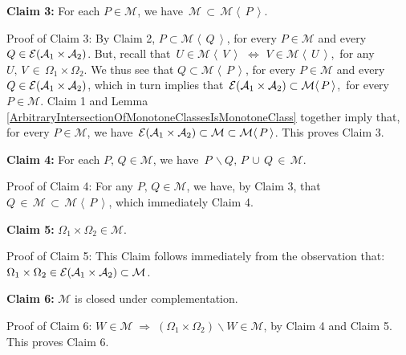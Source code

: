 \vskip 0.5cm
\begin{center}
\begin{minipage}{6.5in}
\textbf{Claim 3:}\quad
For each $P \in \mathcal{M}$, we have \,$\mathcal{M} \,\subset\, \mathcal{M}\!\left\langle\,P\,\right\rangle$.
\end{minipage}
\end{center}
Proof of Claim 3:\quad
By Claim 2, $P \subset \mathcal{M}\!\left\langle\,Q\,\right\rangle$, for every $P\in\mathcal{M}$ and
every $Q \in \mathcal{E}\!\left(\mathcal{A}_{1}\times\mathcal{A}_{2}\right)$.
But, recall that
\,$U\in\mathcal{M}\!\left\langle\,V\,\right\rangle$ $\Longleftrightarrow$ $V\in\mathcal{M}\!\left\langle\,U\,\right\rangle$,\,
for any $U,\,V\,\in\,\Omega_{1}\times\Omega_{2}$.
We thus see that
$Q \subset \mathcal{M}\!\left\langle\,P\,\right\rangle$, for every $P\in\mathcal{M}$ and
every $Q \in \mathcal{E}\!\left(\mathcal{A}_{1}\times\mathcal{A}_{2}\right)$,
which in turn implies that
\,$\mathcal{E}\!\left(\mathcal{A}_{1}\times\mathcal{A}_{2}\right) \subset \mathcal{M}\!\left\langle\,P\,\right\rangle$,\,
for every $P \in \mathcal{M}$.
Claim 1 and Lemma \ref{ArbitraryIntersectionOfMonotoneClassesIsMonotoneClass} together imply that,
for every $P \in \mathcal{M}$, we have
\,$\mathcal{E}\!\left(\mathcal{A}_{1}\times\mathcal{A}_{2}\right) \subset \mathcal{M} \subset \mathcal{M}\!\left\langle\,P\,\right\rangle$.
This proves Claim 3.

\vskip 0.5cm
\begin{center}
\begin{minipage}{6.5in}
\textbf{Claim 4:}\quad
For each $P,\, Q \in \mathcal{M}$, we have \,$P\,\backslash Q,\, P\,\cup\,Q \,\in\, \mathcal{M}$.
\end{minipage}
\end{center}
Proof of Claim 4:\quad
For any $P,\, Q \in \mathcal{M}$, we have, by Claim 3, that
$Q \,\in\, \mathcal{M} \,\subset\, \mathcal{M}\!\left\langle\,P\,\right\rangle$,
which immediately Claim 4.

\vskip 0.5cm
\begin{center}
\begin{minipage}{6.5in}
\textbf{Claim 5:}\quad
$\Omega_{1} \times \Omega_{2} \in \mathcal{M}$.
\end{minipage}
\end{center}
Proof of Claim 5:\quad
This Claim follows immediately from the observation that:
$\Omega_{1} \times \Omega_{2} \in \mathcal{E}\!\left(\mathcal{A}_{1}\times\mathcal{A}_{2}\right) \subset \mathcal{M}$.

\vskip 0.5cm
\begin{center}
\begin{minipage}{6.5in}
\textbf{Claim 6:}\quad
$\mathcal{M}$ is closed under complementation.
\end{minipage}
\end{center}
Proof of Claim 6:\quad
$W \in \mathcal{M}\;\Longrightarrow\;\left(\Omega_{1}\times\Omega_{2}\right)\backslash W \in \mathcal{M}$,
by Claim 4 and Claim 5. This proves Claim 6.

